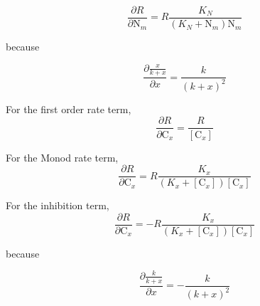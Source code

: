 \documentclass[12pt, a4paper]{article}
\begin{document}
\begin{equation}
\frac{\partial R}{\partial \text{N}_m} = R \frac{K_N}{(K_N + \text{N}_m)\text{N}_m}
\end{equation}

because 

\begin{equation}
\frac{\partial \frac{x}{k+x}}{\partial x} = \frac{k}{(k+x)^2}
\end{equation}

For the first order rate term,
\begin{equation}
\frac{\partial R}{\partial \text{C}_x} = \frac{R}{[\text{C}_x]}
\end{equation}

For the Monod rate term,
\begin{equation}
\frac{\partial R}{\partial \text{C}_x} = R \frac{K_x}{(K_x + [\text{C}_x])[\text{C}_x]}
\end{equation}

For the inhibition term,
\begin{equation}
\frac{\partial R}{\partial \text{C}_x} = -R \frac{K_x}{(K_x + [\text{C}_x])[\text{C}_x]}
\end{equation}

because 

\begin{equation}
\frac{\partial \frac{k}{k+x}}{\partial x} = -\frac{k}{(k+x)^2}
\end{equation}
\end{document}
